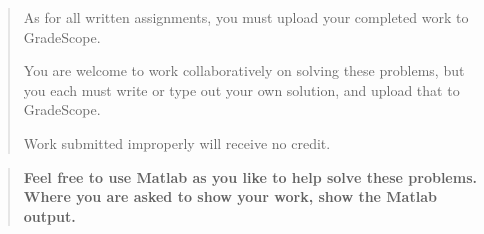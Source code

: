 \documentclass[12pt]{article}
\begin{document}

\begin{quote}
    As for all written assignments, you must upload your completed work to GradeScope.

    You are welcome to work collaboratively on solving these problems, but you each must write or type out your own solution, and upload that to GradeScope.

    Work submitted improperly will receive no credit.
\end{quote}

\begin{quote}\bf
Feel free to use Matlab as you like to help solve these problems.  Where you are asked to show your work, show the Matlab output.
\end{quote}
\end{document}
